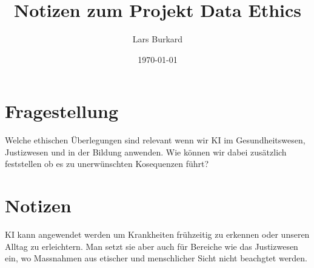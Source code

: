 \documentclass{article}
\title{Notizen zum Projekt Data Ethics}
\author{Lars Burkard}
\date{\today}
\begin{document}
\maketitle


\tableofcontents

\section{Fragestellung
    \label{sec:fragestellung}}


Welche ethischen Überlegungen sind relevant wenn wir KI im Gesundheitswesen, Justizwesen und in der Bildung anwenden. 
Wie können wir dabei zusätzlich feststellen ob es zu unerwünschten Kosequenzen führt?

\section{Notizen}
KI kann angewendet werden um Krankheiten frühzeitig zu erkennen oder unseren Alltag zu erleichtern. Man setzt sie aber auch für Bereiche wie das Justizwesen ein, wo Massnahmen aus etischer und menschlicher Sicht nicht beachgtet werden.  


\printbibliography
\end{document}

